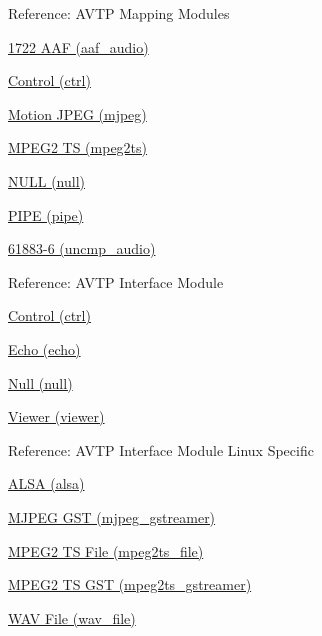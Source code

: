\begin{DoxyItemize}
\item Reference\+: A\+V\+TP Mapping Modules
\begin{DoxyItemize}
\item \hyperlink{aaf_audio_map}{1722 A\+AF (aaf\+\_\+audio)}
\item \hyperlink{ctrl_map}{Control (ctrl)}
\item \hyperlink{mjpeg_map}{Motion J\+P\+EG (mjpeg)}
\item \hyperlink{mpeg2ts_map}{M\+P\+E\+G2 TS (mpeg2ts)}
\item \hyperlink{null_map}{N\+U\+LL (null)}
\item \hyperlink{pipe_map}{P\+I\+PE (pipe)}
\item \hyperlink{uncmp_audio_map}{61883-\/6 (uncmp\+\_\+audio)}
\end{DoxyItemize}
\item Reference\+: A\+V\+TP Interface Module
\begin{DoxyItemize}
\item \hyperlink{ctrl_intf}{Control (ctrl)}
\item \hyperlink{echo_host_intf}{Echo (echo)}
\item \hyperlink{null_host_intf}{Null (null)}
\item \hyperlink{viewer_intf}{Viewer (viewer)}
\end{DoxyItemize}
\item Reference\+: A\+V\+TP Interface Module Linux Specific
\begin{DoxyItemize}
\item \hyperlink{alsa_intf}{A\+L\+SA (alsa)}
\item \hyperlink{mjpeg_gst_intf}{M\+J\+P\+EG G\+ST (mjpeg\+\_\+gstreamer)}
\item \hyperlink{mpeg2ts_file_intf}{M\+P\+E\+G2 TS File (mpeg2ts\+\_\+file)}
\item \hyperlink{mpeg2ts_gst_intf}{M\+P\+E\+G2 TS G\+ST (mpeg2ts\+\_\+gstreamer)}
\item \hyperlink{wav_file_intf}{W\+AV File (wav\+\_\+file)} 
\end{DoxyItemize}
\end{DoxyItemize}